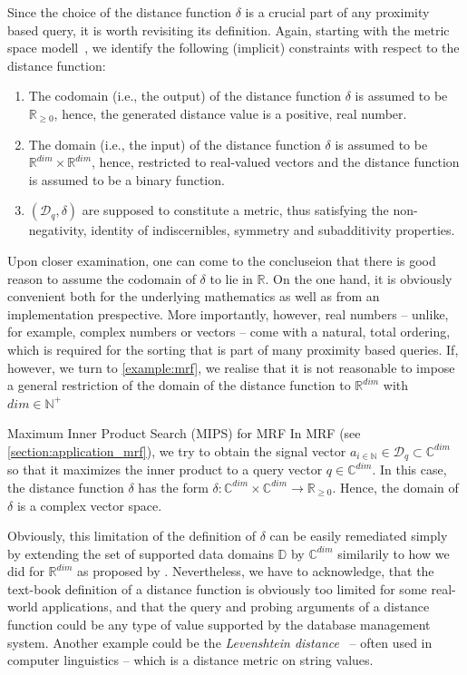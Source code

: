 Since the choice of the distance function $\delta$ is a crucial part of any proximity based query, it is worth revisiting its definition. Again, starting with the metric space modell~\cite{Zezula:2006similarity}, we identify the following (implicit) constraints with respect to the distance function:

\begin{enumerate}
    \item The codomain (i.e., the output) of the distance function $\delta$ is assumed to be $\mathbb{R}_{\geq 0}$, hence, the generated distance value is a positive, real number.
    \item The domain (i.e., the input) of the distance function $\delta$ is assumed to be $\mathbb{R}^{dim} \times \mathbb{R}^{dim}$, hence, restricted to real-valued vectors and the distance function is assumed to be a binary function.
    \item $(\mathcal{D}_q,\delta)$ are supposed to constitute a metric, thus satisfying the non-negativity, identity of indiscernibles, symmetry and subadditivity properties.
\end{enumerate}

Upon closer examination, one can come to the concluseion that there is good reason to assume the codomain of $\delta$ to lie in $\mathbb{R}$. On the one hand, it is obviously convenient both for the underlying mathematics as well as from an implementation prespective. More importantly, however, real numbers -- unlike, for example, complex numbers or vectors -- come with a natural, total ordering, which is required for the sorting that is part of many proximity based queries. If, however, we turn to \cref{example:mrf}, we realise that it is not reasonable to impose a general restriction of the domain of the distance function to $\mathbb{R}^{dim}$ with $dim \in \mathbb{N^{+}}$

\begin{example}[label=example:mrf]{Maximum Inner Product Search (MIPS) for MRF}{}
    In MRF (see \cref{section:application_mrf}), we try to obtain the signal vector $a_{i \in \mathbb{N}} \in \mathcal{D}_q \subset \mathbb{C}^{dim}$ so that it maximizes the inner product to a query vector $q \in \mathbb{C}^{dim}$. In this case, the distance function $\delta$ has the form $\delta \colon \mathbb{C}^{dim} \times \mathbb{C}^{dim} \to \mathbb{R}_{\geq 0}$. Hence, the domain of $\delta$ is a complex vector space.
\end{example}

Obviously, this limitation of the definition of $\delta$ can be easily remediated simply by extending the set of supported data domains $\mathbb{D}$ by $\mathbb{C}^{dim}$ similarily to how we did for $\mathbb{R}^{dim}$ as proposed by \cite{Giangreco:2018thesis}. Nevertheless, we have to acknowledge, that the text-book definition of a distance function is obviously too limited for some real-world applications, and that the query and probing arguments of a distance function could be any type of value supported by the database management system. Another example could be the \emph{Levenshtein distance}~\cite{Levensthtein:1965Binary} -- often used in computer linguistics -- which is a distance metric on string values.

